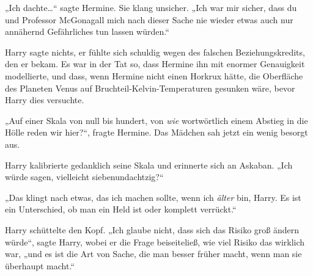 „Ich dachte…“ sagte Hermine. Sie klang unsicher. „Ich war mir sicher, dass du und Professor McGonagall mich nach dieser Sache nie wieder etwas auch nur annähernd Gefährliches tun lassen würden.“

Harry sagte nichts, er fühlte sich schuldig wegen des falschen Beziehungskredits, den er bekam. Es war in der Tat so, dass Hermine ihn mit enormer Genauigkeit modellierte, und dass, wenn Hermine nicht einen Horkrux hätte, die Oberfläche des Planeten Venus auf Bruchteil-Kelvin-Temperaturen gesunken wäre, bevor Harry dies versuchte.

„Auf einer Skala von null bis hundert, von \emph{wie} wortwörtlich einem Abstieg in die Hölle reden wir hier?“, fragte Hermine. Das Mädchen sah jetzt ein wenig besorgt aus.

Harry kalibrierte gedanklich seine Skala und erinnerte sich an Askaban.
„Ich würde sagen, vielleicht siebenundachtzig?“

„Das klingt nach etwas, das ich machen sollte, wenn ich \emph{älter} bin, Harry. Es ist ein Unterschied, ob man ein Held ist oder komplett verrückt.“

Harry schüttelte den Kopf. „Ich glaube nicht, dass sich das Risiko groß ändern würde“, sagte Harry, wobei er die Frage beiseiteließ, wie viel Risiko das wirklich war, „und es ist die Art von Sache, die man besser früher macht, wenn man sie überhaupt macht.“

